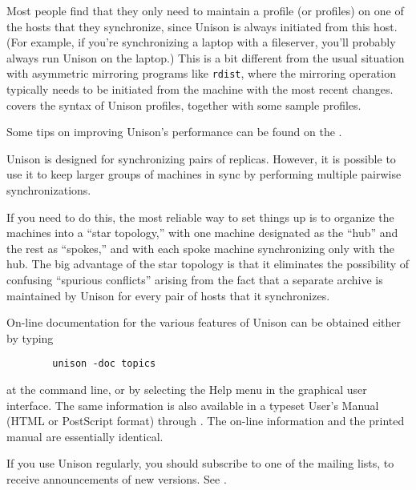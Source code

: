 \documentclass{article}
\begin{document}
Most people find that they only need to maintain a profile (or
profiles) on one of the hosts that they synchronize, since Unison is
always initiated from this host.  (For example, if you're
synchronizing a laptop with a fileserver, you'll probably always run
Unison on the laptop.)  This is a bit different from the usual
situation with asymmetric mirroring programs like \verb|rdist|, where
the mirroring operation typically needs to be initiated from the
machine with the most recent changes.  
covers the syntax of Unison profiles, together with some sample profiles.

Some tips on improving Unison's performance can be found on the
.


Unison is designed for synchronizing pairs of replicas.  However, it is
possible to use it to keep larger groups of machines in sync by performing
multiple pairwise synchronizations.

If you need to do this, the most reliable way to set things up is to
organize the machines into a ``star topology,'' with one machine designated
as the ``hub'' and the rest as ``spokes,'' and with each spoke machine
synchronizing only with the hub.  The big advantage of the star topology is
that it eliminates the possibility of confusing ``spurious conflicts''
arising from the fact that a separate archive is maintained by Unison for
every pair of hosts that it synchronizes.



On-line documentation for the various features of Unison
can be obtained either by typing
\begin{verbatim}
        unison -doc topics
\end{verbatim}
\noindent
at the command line, or by selecting the Help menu in the graphical
user interface.
\iftextversion
The same information is also available in a typeset User's
Manual (HTML or PostScript format) through
.
\else
The on-line information and the printed manual are essentially identical.
\fi

If you use Unison regularly, you should subscribe to one of the mailing
lists, to receive announcements of new versions.  See
.
\end{document}
